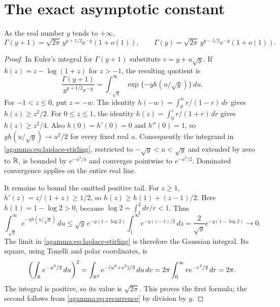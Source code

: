 \section{The exact asymptotic constant}\label{agamma:sec:stirling}
\begin{agammalemma}\label{agamma:lem:stirling}
As the real number $y$ tends to $+\infty$,
\begin{equation}\label{agamma:eq:stirling}
\Gamma(y+1)=\sqrt{2\pi}\,y^{y+1/2}e^{-y}(1+o(1)),
\qquad
\Gamma(y)=\sqrt{2\pi}\,y^{y-1/2}e^{-y}(1+o(1)).
\end{equation}
\end{agammalemma}
\begin{proof}
In Euler's integral for $\Gamma(y+1)$ substitute $v=y+u\sqrt y$.
If $h(z)=z-\log(1+z)$ for $z>-1$, the resulting quotient is
\begin{equation}\label{agamma:eq:laplace-stirling}
\frac{\Gamma(y+1)}{y^{y+1/2}e^{-y}}
=\int_{-\sqrt y}^{\infty}\exp\{-y h(u/\sqrt y)\}\,du.
\end{equation}
For $-1<z\le0$, put $z=-w$. The identity
$h(-w)=\int_0^w r/(1-r)\,dr$ gives $h(z)\ge z^2/2$.
For $0\le z\le1$, the identity
$h(z)=\int_0^z r/(1+r)\,dr$ gives $h(z)\ge z^2/4$.
Also $h(0)=h'(0)=0$ and $h''(0)=1$, so
$y h(u/\sqrt y)\to u^2/2$ for every fixed real $u$.
Consequently the integrand in \eqref{agamma:eq:laplace-stirling}, restricted
to $-\sqrt y<u<\sqrt y$ and extended by zero to $\mathbb R$, is bounded
by $e^{-u^2/4}$ and converges pointwise to $e^{-u^2/2}$.
Dominated convergence applies on the entire real line.

It remains to bound the omitted positive tail. For $z\ge1$,
$h'(z)=z/(1+z)\ge1/2$, so
$h(z)\ge h(1)+(z-1)/2$. Here $h(1)=1-\log2>0$, because
$\log2=\int_1^2 dr/r<1$. Thus
\begin{equation}\label{agamma:eq:stirling-tail}
\int_{\sqrt y}^{\infty}e^{-y h(u/\sqrt y)}\,du
\le \sqrt y\,e^{-y(1-\log2)}
\int_1^{\infty}e^{-y(z-1)/2}\,dz
=\frac2{\sqrt y}e^{-y(1-\log2)}\longrightarrow0.
\end{equation}
The limit in \eqref{agamma:eq:laplace-stirling} is therefore the Gaussian
integral. Its square, using Tonelli and polar coordinates, is
\[
\left(\int_{\mathbb R}e^{-u^2/2}\,du\right)^2
=\int_{\mathbb R^2}e^{-(u^2+v^2)/2}\,du\,dv
=2\pi\int_0^\infty r e^{-r^2/2}\,dr=2\pi.
\]
The integral is positive, so its value is $\sqrt{2\pi}$.
This proves the first formula; the second follows from
\eqref{agamma:eq:recurrence} by division by $y$.
\end{proof}

